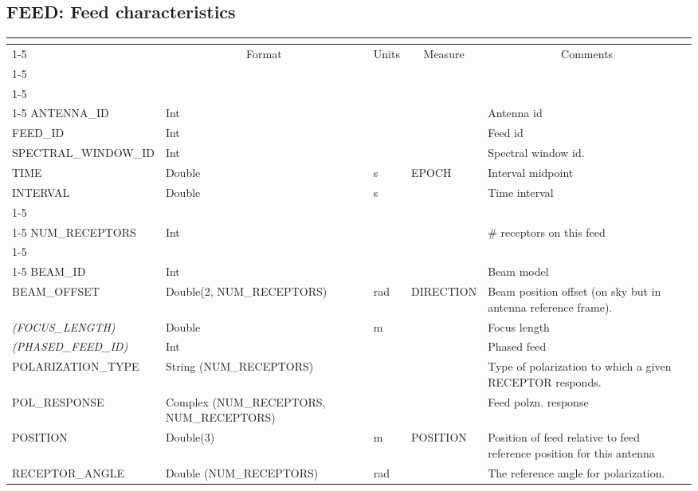 \documentclass{article}
\newcommand{\defline}[1]{\cline{1-5}
\multicolumn{5}{|l|}{#1} \\
\cline{1-5}}
\newcommand{\definetable}[3][]
{
  \vfill\newpage
  \subsection{#2}
  \label{tbl:#1}
  \vspace{0.15in}
  \small
  \begin{tabular}{|l|p{1.25in}|l|p{.9in}|p{1.4in}|}
  \hline
  \multicolumn{5}{|c|}{\bf #1}\\
  \cline{1-5}
  \multicolumn{1}{|c|}{Name}&\multicolumn{1}{|c|}{Format}&
  \multicolumn{1}{|c|}{Units}&\multicolumn{1}{|c|}{Measure}&
  \multicolumn{1}{|c|}{Comments}\\
  \cline{1-5}
  #3
  \hline
  \end{tabular}
}
\begin{document}
\definetable{FEED: Feed characteristics}{
\defline{\bf Columns}
\defline{\em Key}
ANTENNA\_ID &     Int &    &      & Antenna id\\
FEED\_ID &        Int &    &      & Feed id\\
SPECTRAL\_WINDOW\_ID &   Int &    &      & Spectral window id.\\
TIME &   Double  &      s  & EPOCH & Interval midpoint \\
INTERVAL &       Double  &      s     &       & Time interval\\
\defline{\em Data description}
NUM\_RECEPTORS &  Int &    &      & \# receptors on this feed \\
\defline{\em Data}
BEAM\_ID &        Int    &    &      & Beam model\\
BEAM\_OFFSET &    Double(2, NUM\_RECEPTORS)    &     rad & DIRECTION & Beam position offset (on sky but in antenna reference frame).\\
{\it (FOCUS\_LENGTH)} &   Double &    m       &       & Focus length \\
{\it (PHASED\_FEED\_ID)} & Int   &    &      & Phased feed\\
POLARIZATION\_TYPE &       String (NUM\_RECEPTORS) &    &      & Type of polarization to which a given RECEPTOR responds.\\
POL\_RESPONSE &  Complex (NUM\_RECEPTORS, NUM\_RECEPTORS) &    &      & Feed polzn. response\\
POSITION &    Double(3)  & m  &         POSITION & Position of feed relative to feed reference position for this antenna\\
RECEPTOR\_ANGLE &    Double (NUM\_RECEPTORS) &    rad &    & The reference angle for polarization.\\
}
\end{document}
